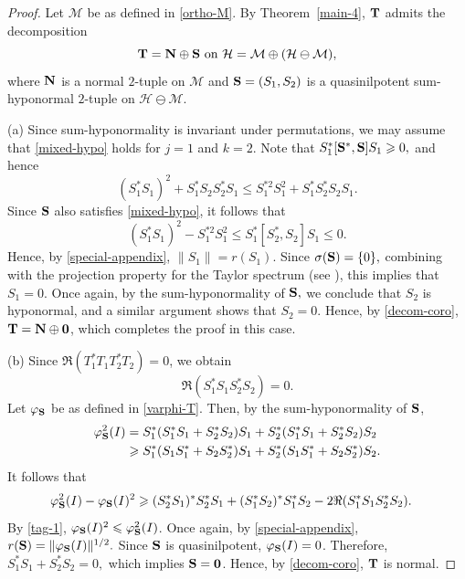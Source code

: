 \documentclass[10pt, a4paper, oneside, reqno]{amsproc}
\numberwithin{equation}{section}
\theoremstyle{remark}
\theoremstyle{definition}
\newcommand*{\Ge}{\geqslant}
\newcommand*{\Le}{\leqslant}
\begin{document}
\begin{proof} 
Let $\mathcal M$ be as defined in \eqref{ortho-M}. By Theorem~\ref{main-4}, ${\bf T}$ admits the decomposition
\begin{equation}
\label{decom-coro}
{\bf T}={\bf N} \oplus {\bf S}~\mbox{on~}\mathcal H = \mathcal M \oplus (\mathcal H \ominus \mathcal M),
\end{equation}
where ${\bf N}$ is a normal $2$-tuple on $\mathcal M$ and ${\bf S}=(S_1, S_2)$ is a quasinilpotent sum-hyponormal $2$-tuple on $\mathcal H \ominus \mathcal M$. 

(a) Since sum-hyponormality is invariant under permutations, we may assume that \eqref{mixed-hypo} holds for $j=1$ and $k=2$.
Note that $S^*_1[{\bf S}^*, {\bf S}]S_1 \Ge 0,$ and hence $$(S^*_1S_1)^2 + S^*_1S_2S^*_2S_1 \Le S^{*2}_1S^2_1 + S^*_1S^*_2S_2S_1.$$
Since ${\bf S}$ also satisfies \eqref{mixed-hypo}, it follows that $$(S^*_1S_1)^2 - S^{*2}_1S^2_1 \Le S^*_1[S^*_2, S_2]S_1 \Le 0.$$ Hence, by \eqref{special-appendix}, $\|S_1\|=r(S_1)$. Since $\sigma({\bf S})=\{0\},$ 
combining with the projection property for the Taylor spectrum (see \cite[Lemma~3.1]{T1970}), this implies that 
$S_1=0$. Once again, by the sum-hyponormality of ${\bf S},$ we conclude that $S_2$ is hyponormal, and a similar argument shows that $S_2=0$. Hence, by \eqref{decom-coro}, ${\bf T}={\bf N}\oplus {\bf 0}$, which completes the proof in this case.

(b) 
Since $\Re(T_1^*T_1T_2^*T_2)=0$,
we obtain 
\begin{equation}
\label{tag-1}
\Re(S_1^*S_1S_2^*S_2)=0.
\end{equation}
Let $\varphi_{\bf S}$ be as defined in \eqref{varphi-T}.
Then, by the sum-hyponormality of ${\bf S}$,
\begin{align*}
\varphi^2_{\bf S}(I)
&=
S_1^*(S_1^*S_1+S_2^*S_2)S_1
+
S_2^*(S_1^*S_1+S_2^*S_2)S_2
\\
&\Ge
S_1^*(S_1S_1^*+S_2S_2^*)S_1
+
S_2^*(S_1S_1^*+S_2S_2^*)S_2.
\end{align*}
It follows that 
\begin{align*}
\varphi^2_{\bf S}(I)- \varphi_{\bf S}(I)^2
&\Ge
(S_2^*S_1)^*S_2^*S_1
+
(S_1^*S_2)^*S_1^*S_2
-
2\Re(S_1^*S_1S_2^*S_2).
\end{align*}
By \eqref{tag-1},
$\varphi_{\bf S}(I)^2 \Le \varphi^2_{\bf S}(I)$.
Once again, by \eqref{special-appendix},
$r({\bf S})
=
\|\varphi_{\bf S}(I)\|^{1/2}.$
Since ${\bf S}$ is quasinilpotent,
$\varphi_{\bf S}(I)=0$.
Therefore,
$S_1^*S_1+S_2^*S_2=0,$
which implies
${\bf S}={\bf 0}$.
Hence, by \eqref{decom-coro}, ${\bf T}$ is normal.
\end{proof}
\end{document}
